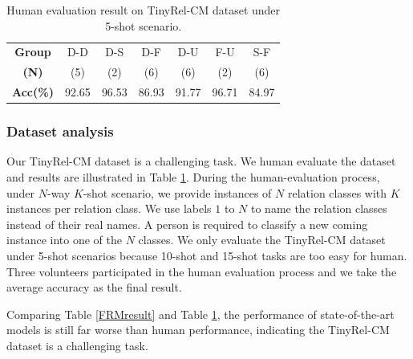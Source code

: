 \begin{table}[ht]
	\centering
	\small
	\caption{Human evaluation result on TinyRel-CM dataset under 5-shot scenario.}
	\label{human}
	\begin{tabular}{|c|cccccc|}
		\hline
		\textbf{Group} & D-D & D-S & D-F & D-U & F-U & S-F \\
		\textbf{(N)} & (5) & (2) & (6) & (6) & (2) & (6) \\ \hline
		\textbf{Acc(\%)} & 92.65 &96.53 & 86.93 & 91.77 & 96.71& 84.97\\ \hline
	\end{tabular}
\end{table}

\subsubsection{Dataset analysis}
Our TinyRel-CM dataset is a challenging task.
We human evaluate the dataset and results are illustrated in Table \ref{human}.
During the human-evaluation process, under $N$-way $K$-shot scenario, we provide instances of $N$ relation classes with $K$ instances per relation class. We use labels $1$ to $N$ to name the relation classes instead of their real names. A person is required to classify a new coming instance into one of the $N$ classes. 
We only evaluate the TinyRel-CM dataset under 5-shot scenarios because 10-shot and 15-shot tasks are too easy for human.
Three volunteers participated in the human evaluation process and we take the average accuracy as the final result.

Comparing Table \ref{FRMresult} and Table \ref{human}, the performance of state-of-the-art models is still far worse than human performance, indicating the TinyRel-CM dataset is a challenging task.


